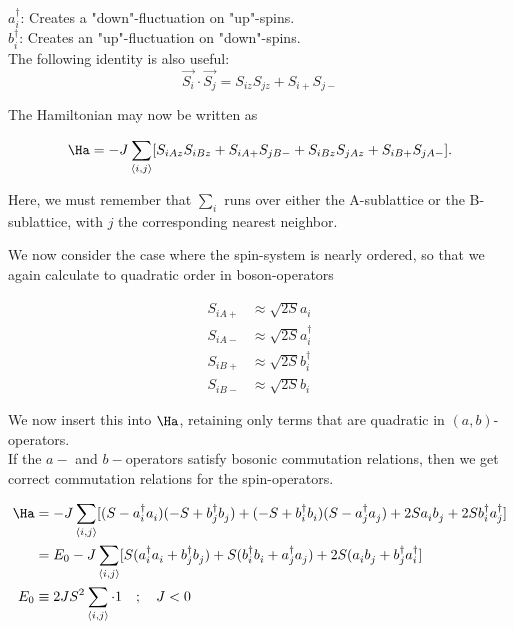 $a_i^\dagger$: Creates a "down"-fluctuation on "up"-spins. \\
$b_i^\dagger$: Creates an "up"-fluctuation on "down"-spins. \\

The following identity is also useful:
\begin{equation}
    \Vec{S_i} \cdot \Vec{S_j} = S_{iz}S_{jz} + S_{i+}S_{j-}
\end{equation}

The Hamiltonian may now be written as

\begin{equation}
    \Ha = -J \sum_{\langle i, j \rangle} [S_{iAz}S_{iBz} + S_{iA+}S_{jB-} + S_{iBz}S_{jAz} + S_{iB+}S_{jA-}].
\end{equation}

\begin{tcolorbox}
    Here, we must remember that $\sum_i$ runs over either the A-sublattice or the B-sublattice, with $j$ the corresponding nearest neighbor.
\end{tcolorbox}

We now consider the case where the spin-system is nearly ordered, so that we again calculate to quadratic order in boson-operators

\begin{align}
    S_{iA+} &\approx \sqrt{2S}a_i \\
    S_{iA-} &\approx \sqrt{2S}a_i^\dagger \\
    S_{iB+} &\approx \sqrt{2S}b_i^\dagger \\
    S_{iB-} &\approx \sqrt{2S}b_i 
\end{align}

We now insert this into $\Ha$, retaining only terms that are quadratic in $(a, b)$-operators. \\

If the $a-$ and $b-$operators satisfy bosonic commutation relations, then we get correct commutation relations for the spin-operators.

\begin{align}
    \Ha &= -J \sum_{\langle i, j \rangle} [(S - a_i^\dagger a_i^{})(-S + b_j^\dagger b_j^{}) + (-S + b_i^\dagger b_i^{})(S - a_j^\dagger a_j^{}) + 2S a_i^{} b_j^{} + 2S b_i^\dagger a_j ^\dagger] \\
    &= E_0 - J\sum_{\langle i, j \rangle} [S(a_i^\dagger a_i^{} + b_j^\dagger b_j^{}) + S(b_i^\dagger b_i^{} + a_j^\dagger a_j^{}) + 2S (a_i^{} b_j^{} + b_j^\dagger a_i^\dagger] \\
    E_0 &\equiv 2JS^2 \sum_{\langle i, j \rangle}\cdot 1 \quad ; \quad J < 0
\end{align}

